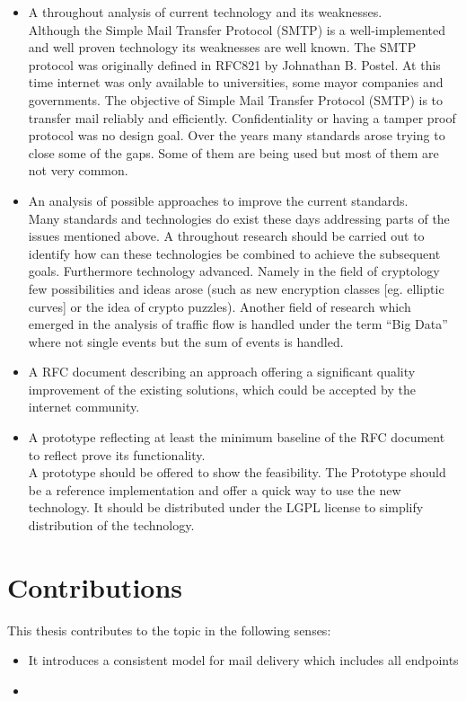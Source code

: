 \begin{itemize}
  \item A throughout analysis of current technology and its weaknesses.\\
	      Although the Simple Mail Transfer Protocol (SMTP) is a well-implemented and well proven technology its weaknesses are well known. The SMTP protocol was originally defined in RFC821\cite{RFC821} by Johnathan B. Postel. At this time internet was only available to universities, some mayor companies and governments. The objective of Simple Mail Transfer Protocol (SMTP) is to transfer mail reliably and efficiently\cite[p.~1]{RFC821}. Confidentiality or having a tamper proof protocol was no design goal. Over the years many standards arose trying to close some of the gaps. Some of them are being used but most of them are not very common. 
	\item An analysis of possible approaches to improve the current standards.\\
	      Many standards and technologies do exist these days addressing parts of the issues mentioned above. A throughout research should be carried out to identify how can these technologies be combined to achieve the subsequent goals. Furthermore technology advanced. Namely in the field of cryptology few possibilities and ideas arose (such as new encryption classes [eg. elliptic curves] or the idea of crypto puzzles). Another field of research which emerged in the analysis of traffic flow is handled under the term ``Big Data'' where not single events but the sum of events is handled.
	\item A RFC document describing an approach offering a significant quality improvement of the existing solutions, which could be accepted by the internet community.
	\item A prototype reflecting at least the minimum baseline of the RFC document to reflect prove its functionality.\\
	      A prototype should be offered to show the feasibility. The Prototype should be a reference implementation and offer a quick way to use the new technology. It should be distributed under the LGPL license to simplify distribution of the technology. 
\end{itemize}

\section{Contributions}
This thesis contributes to the topic in the following senses:
\begin{itemize}
\item It introduces a consistent model for mail delivery which includes all endpoints
\item 
\end{itemize}